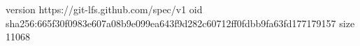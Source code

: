 version https://git-lfs.github.com/spec/v1
oid sha256:665f30f0983e607a08b9e099ea643f9d282c60712ff0fdbb9fa63fd177179157
size 11068
